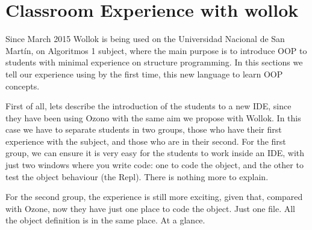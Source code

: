 \section{Classroom Experience with wollok}
\label{experience}

Since March 2015 Wollok is being used on the Universidad Nacional de San Martín, on Algoritmos 1 subject, where the main purpose is to introduce OOP to students with minimal experience on structure programming.
In this sections we tell our experience using by the first time, this new language to learn OOP concepts.

First of all, lets  describe the introduction of the students to a new IDE, since they have been using Ozono with the same aim we propose with Wollok. In this case we have to separate students in two groups,  those who have their first experience with the subject, and those who are in their second.
For the first group, we can ensure it is very easy for the students to work inside an IDE, with just two windows where you write code: one to code the object, and the other to test the object behaviour (the Repl). There is nothing more to explain.

For the second group, the experience is still more exciting, given that, compared with Ozone, now they have just one place to code the object. Just one file. All the object definition is in the same place. At a glance.




